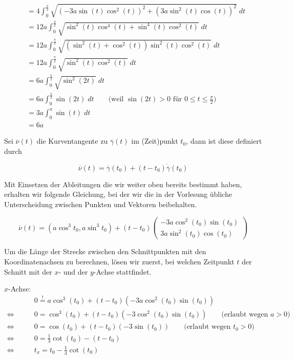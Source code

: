 \documentclass[a4paper,german,12pt,smallheadings]{scrartcl}
\begin{document}
\begin{align*}
  &= 4 \int_0^{\frac{\pi}{2}}   \sqrt{\left(-3a \sin(t) \cos^2(t) \right)^2 + \left(3a \sin^2(t) \cos(t)\right)^2} \; dt \\
  &= 12a \int_0^{\frac{\pi}{2}} \sqrt{\sin^2(t) \cos^4(t) + \sin^4(t) \cos^2(t)} \; dt \\
  &= 12a \int_0^{\frac{\pi}{2}} \sqrt{(\sin^2(t) + \cos^2(t)) \sin^2(t)\cos^2(t)} \; dt \\
  &= 12a \int_0^{\frac{\pi}{2}} \sqrt{\sin^2(t)\cos^2(t)} \; dt \\
  &= 6a \int_0^{\frac{\pi}{2}}  \sqrt{\sin^2(2t)} \; dt \\
  &= 6a \int_0^{\frac{\pi}{2}}  \sin(2t) \; dt \qquad \text{(weil $\sin(2t) > 0$ für $0 \le t \le \frac{\pi}{2}$)} \\
  &= 3a \int_0^{\pi}            \sin(t) \; dt \\
  &= 6a
\end{align*}

Sei $\overline{\nu}(t)$ die Kurventangente zu $\overline{\gamma}(t)$ im
(Zeit)punkt $t_0$, dann ist diese definiert durch

\begin{equation*}
  \overline{\nu}(t) = \overline{\gamma}(t_0) + (t - t_0) \dot{\overline{\gamma}}(t_0)
\end{equation*}

Mit Einsetzen der Ableitungen die wir weiter oben bereits bestimmt haben,
erhalten wir folgende Gleichung, bei der wir die in der Vorlesung übliche
Unterscheidung zwischen Punkten und Vektoren beibehalten.

\begin{equation*}
  \overline{\nu}(t) = (a \cos^3 t_0, a \sin^3 t_0) + (t-t_0) \begin{pmatrix} -3a \cos^2(t_0) \sin(t_0) \\ 3a \sin^2(t_0) \cos(t_0) \end{pmatrix}
\end{equation*}

Um die Länge der Strecke zwischen den Schnittpunkten mit den Koordinatenachsen
zu berechnen, lösen wir zuerst, bei welchen Zeitpunkt $t$ der Schnitt mit der
$x$- und der $y$-Achse stattfindet.

$x$-Achse:
\begin{align*}
  &0 \overset{!}{=} a \cos^3(t_0) + (t-t_0)(-3a \cos^2(t_0) \sin(t_0)) \\
  \Leftrightarrow\qquad &0 = \cos^3(t_0) + (t-t_0)(-3 \cos^2(t_0) \sin(t_0)) \qquad \text{(erlaubt wegen $a>0$)}\\
  \Leftrightarrow\qquad &0 = \cos(t_0) + (t-t_0)(-3 \sin(t_0)) \qquad \text{(erlaubt wegen $t_0 > 0$)}\\
  \Leftrightarrow\qquad &0 = \frac{1}{3} \cot(t_0) - (t - t_0) \\
  \Leftrightarrow\qquad &t_x = t_0 - \frac{1}{3} \cot(t_0)
\end{align*}
\end{document}
